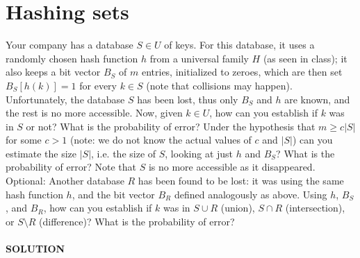 \documentclass[a4paper]{article}
\begin{document}
\section*{Hashing sets}
Your company has a database $S \in U$ of keys. For this database, it uses a randomly chosen hash function $h$ from a universal family $H$ (as seen in class); it also keeps a bit vector $B_S$ of $m$ entries, initialized to zeroes, which are then set $B_S[h(k)] = 1$ for every $k \in S$ (note that collisions may happen). Unfortunately, the database $S$ has been lost, thus only $B_S$ and $h$ are known, and the rest is no more accessible. Now, given $k \in U$, how can you establish if $k$ was in $S$ or not? What is the probability of error? Under the hypothesis that $m \geq c|S|$ for some $c > 1$ (note: we do not know the actual values of $c$ and $|S|$) can you estimate the size $|S|$, i.e. the size of $S$, looking at just $h$ and $B_S$? What is the probability of error? Note that $S$ is no more accessible as it disappeared.\\ 
Optional: Another database $R$ has been found to be lost: it was using the same hash function $h$, and the bit vector $B_R$ defined analogously as above. Using $h$, $B_S$, and $B_R$, how can you establish if $k$ was in $S \cup R$ (union), $S \cap R$ (intersection), or $S \setminus R$ (difference)? What is the probability of error?\\
\\
\textbf{SOLUTION}
\\
\end{document}
